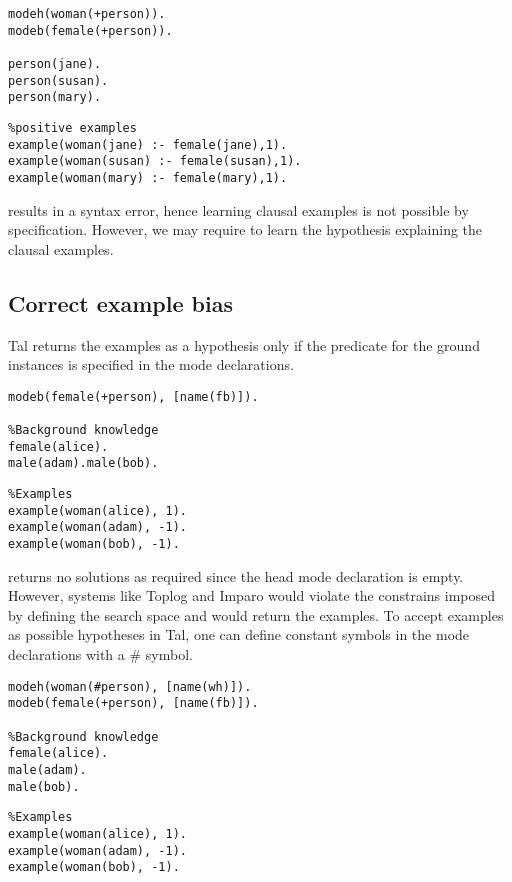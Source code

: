 \begin{minipage}[t]{.35\textwidth}
\begin{lstlisting}
modeh(woman(+person)).
modeb(female(+person)).

person(jane).
person(susan).
person(mary).
\end{lstlisting}
\end{minipage}
\begin{minipage}[t]{.20\textwidth}
\begin{lstlisting}
%positive examples
example(woman(jane) :- female(jane),1).
example(woman(susan) :- female(susan),1).
example(woman(mary) :- female(mary),1).

\end{lstlisting}
\end{minipage}

results in a syntax error, hence learning clausal examples is not possible by specification. However, we may require to learn the hypothesis
explaining the clausal examples.

\subsection{Correct example bias}
Tal returns the examples as a hypothesis only if the predicate for the ground instances is specified in the mode declarations.

\begin{minipage}[t]{.55\textwidth}
\begin{lstlisting}
modeb(female(+person), [name(fb)]).

%Background knowledge
female(alice).
male(adam).male(bob).
\end{lstlisting}
\end{minipage}
\begin{minipage}[t]{.20\textwidth}
\begin{lstlisting}
%Examples
example(woman(alice), 1).
example(woman(adam), -1).
example(woman(bob), -1).
\end{lstlisting}
\end{minipage}

returns no solutions as required since the head mode declaration is empty. However, systems like Toplog and Imparo would violate the constrains imposed by defining the search space and would return the examples.
To accept examples as possible hypotheses in Tal, one can define constant symbols in the mode declarations with a \# symbol.

\begin{minipage}[t]{.55\textwidth}
\begin{lstlisting}
modeh(woman(#person), [name(wh)]).
modeb(female(+person), [name(fb)]).

%Background knowledge
female(alice).
male(adam).
male(bob).
\end{lstlisting}
\end{minipage}
\begin{minipage}[t]{.20\textwidth}
\begin{lstlisting}
%Examples
example(woman(alice), 1).
example(woman(adam), -1).
example(woman(bob), -1).
\end{lstlisting}
\end{minipage}

